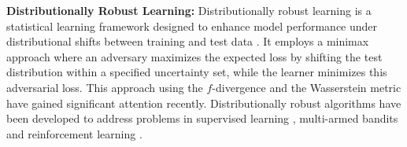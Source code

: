 \textbf{Distributionally Robust Learning: } Distributionally robust learning is a statistical learning framework designed to enhance model performance under distributional shifts between training and test data \cite{chen2018robust}. It employs a minimax approach where an adversary maximizes the expected loss by shifting the test distribution within a specified uncertainty set, while the learner minimizes this adversarial loss. This approach using the $f$-divergence \citep{namkoong2016stochastic,duchi2018learning, levy2020large} and the Wasserstein metric \citep{esfahani2015data,kuhn2019wasserstein,gao2022wasserstein} have gained significant attention recently. Distributionally robust algorithms have been developed to address problems in supervised learning \cite{chen2018robust, namkoong2016stochastic, levy2020large}, multi-armed bandits \cite{si2020distributionally, yang2023distributionally} and reinforcement learning \cite{panaganti-rfqi, zhou2024natural, shi2024distributionally,yang2022toward}.

